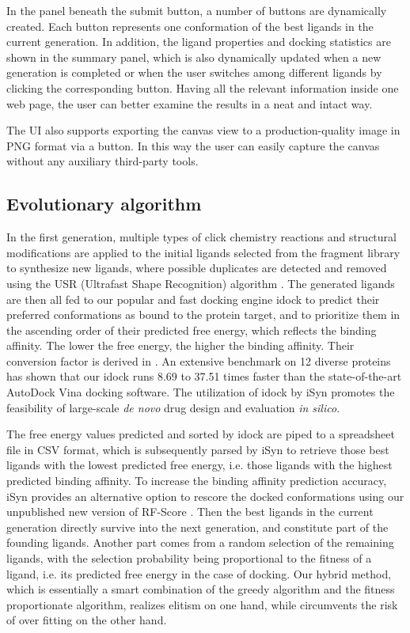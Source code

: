 In the panel beneath the submit button, a number of buttons are dynamically created. Each button represents one conformation of the best ligands in the current generation. In addition, the ligand properties and docking statistics are shown in the summary panel, which is also dynamically updated when a new generation is completed or when the user switches among different ligands by clicking the corresponding button. Having all the relevant information inside one web page, the user can better examine the results in a neat and intact way.

The UI also supports exporting the canvas view to a production-quality image in PNG format via a button. In this way the user can easily capture the canvas without any auxiliary third-party tools.

\subsection{Evolutionary algorithm}

In the first generation, multiple types of click chemistry reactions and structural modifications are applied to the initial ligands selected from the fragment library to synthesize new ligands, where possible duplicates are detected and removed using the USR (Ultrafast Shape Recognition) algorithm \citep{1379}. The generated ligands are then all fed to our popular and fast docking engine idock \citep{1153} to predict their preferred conformations as bound to the protein target, and to prioritize them in the ascending order of their predicted free energy, which reflects the binding affinity. The lower the free energy, the higher the binding affinity. Their conversion factor is derived in \citep{1362}. An extensive benchmark on 12 diverse proteins \citep{1362} has shown that our idock \citep{1153} runs 8.69 to 37.51 times faster than the state-of-the-art AutoDock Vina \citep{595} docking software. The utilization of idock by iSyn promotes the feasibility of large-scale \textit{de novo} drug design and evaluation \textit{in silico}.

The free energy values predicted and sorted by idock are piped to a spreadsheet file in CSV format, which is subsequently parsed by iSyn to retrieve those best ligands with the lowest predicted free energy, i.e. those ligands with the highest predicted binding affinity. To increase the binding affinity prediction accuracy, iSyn provides an alternative option to rescore the docked conformations using our unpublished new version of RF-Score \citep{564}. Then the best ligands in the current generation directly survive into the next generation, and constitute part of the founding ligands. Another part comes from a random selection of the remaining ligands, with the selection probability being proportional to the fitness of a ligand, i.e. its predicted free energy in the case of docking. Our hybrid method, which is essentially a smart combination of the greedy algorithm and the fitness proportionate algorithm, realizes elitism on one hand, while circumvents the risk of over fitting on the other hand.

